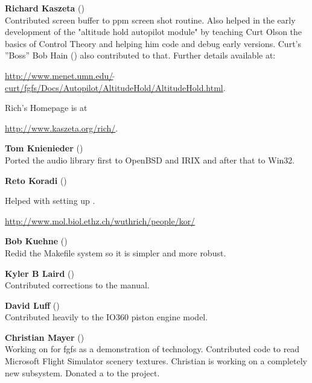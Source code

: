 \noindent \textbf{Richard Kaszeta}  ()\\
  Contributed screen buffer to ppm screen shot routine.
  Also helped in the early development of the "altitude
  hold autopilot module" by teaching Curt Olson the basics of Control Theory
  and helping him code and debug early versions. Curt's ''Boss'' Bob Hain
 () also contributed to that.  Further details available at:
 \medskip

  \href{http://www.menet.umn.edu/~curt/fgfs/Docs/Autopilot/AltitudeHold/AltitudeHold.html}{http://www.menet.umn.edu/$\tilde{~~}$curt/fgfs/Docs/Autopilot/AltitudeHold/AltitudeHold.html}.
  \medskip

\noindent
  Rich's Homepage is at
  \medskip

  \href{http://www.kaszeta.org/rich/}{http://www.kaszeta.org/rich/}.
  \medskip

\noindent \textbf{Tom Knienieder} ()\\
  Ported the audio library first to OpenBSD and IRIX and after that to Win32.
 \medskip

\noindent \textbf{Reto Koradi} ()
 \medskip

  Helped with setting up .
 \medskip

\href{http://www.mol.biol.ethz.ch/wuthrich/people/kor/}{http://www.mol.biol.ethz.ch/wuthrich/people/kor/}
 \medskip

\noindent \textbf{Bob Kuehne} ()\\
  Redid the Makefile system so it is simpler and more robust.
 \medskip

\noindent \textbf{Kyler B Laird} ()\\
 Contributed corrections to the manual.
 \medskip

\noindent \textbf{David Luff} ()\\
 Contributed heavily to the IO360 piston engine model.
 \medskip

\noindent \textbf{Christian Mayer}
()\\
 Working on  for fgfs as a demonstration of technology.
 Contributed code to read Microsoft Flight Simulator scenery textures. Christian is working on a completely new  subsystem.
 Donated a  to the project.
 \medskip

